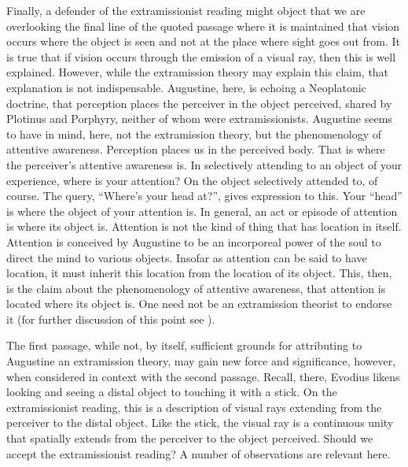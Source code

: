\documentclass[12pt]{article}
\begin{document}
Finally, a defender of the extramissionist reading might object that we are overlooking the final line of the quoted passage where it is maintained that vision occurs where the object is seen and not at the place where sight goes out from. It is true that if vision occurs through the emission of a visual ray, then this is well explained. However, while the extramission theory may explain this claim, that explanation is not indispensable. Augustine, here, is echoing a Neoplatonic doctrine, that perception places the perceiver in the object perceived, shared by Plotinus and Porphyry, neither of whom were extramissionists. Augustine seems to have in mind, here, not the extramission theory, but the phenomenology of attentive awareness. Perception places us in the perceived body. That is where the perceiver’s attentive awareness is. In selectively attending to an object of your experience, where is your attention? On the object selectively attended to, of course. The query, ``Where’s your head at?'', gives expression to this. Your ``head'' is where the object of your attention is. In general, an act or episode of attention is where its object is. Attention is not the kind of thing that has location in itself. Attention is conceived by Augustine to be an incorporeal power of the soul to direct the mind to various objects. Insofar as attention can be said to have location, it must inherit this location from the location of its object. This, then, is the claim about the phenomenology of attentive awareness, that attention is located where its object is. One need not be an extramission theorist to endorse it (for further discussion of this point see \citealt[chapter 6]{Kalderon:2018oe}).

The first passage, while not, by itself, sufficient grounds for attributing to Augustine an extramission theory, may gain new force and significance, however, when considered in context with the second passage. Recall, there, Evodius likens looking and seeing a distal object to touching it with a stick. On the extramissionist reading, this is a description of visual rays extending from the perceiver to the distal object. Like the stick, the visual ray is a continuous unity that spatially extends from the perceiver to the object perceived. Should we accept the extramissionist reading? A number of observations are relevant here.
\end{document}
